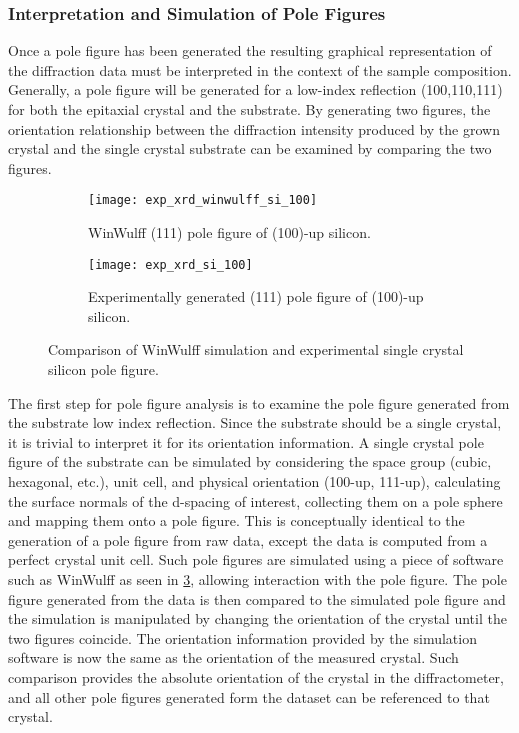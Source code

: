 \subsubsection{Interpretation and Simulation of Pole Figures} Once a pole figure has been generated the resulting graphical representation of the diffraction data must be interpreted in the context of the sample composition.
Generally, a pole figure will be generated for a low-index reflection (100,110,111) for both the epitaxial crystal and the substrate.
By generating two figures, the orientation relationship between the diffraction intensity produced by the grown crystal and the single crystal substrate can be examined by comparing the two figures.
\begin{figure}
 \centering \centering
 \begin{subfigure}[t]{0.53\textwidth}
  \centering \texttt{[image: exp\_xrd\_winwulff\_si\_100]}
  \caption{\label{fig:exp_xrd_winwulff_si_100}WinWulff (111) pole figure of (100)-up silicon.}
 \end{subfigure}\quad%
 \begin{subfigure}[t]{0.43\textwidth}
  \centering \texttt{[image: exp\_xrd\_si\_100]}
  \caption{\label{fig:exp_xrd_si_100}Experimentally generated (111) pole figure of (100)-up silicon.}
 \end{subfigure}
 \caption{\label{fig:exp_xray_winwulff}Comparison of WinWulff simulation and experimental single crystal silicon pole figure.}
\end{figure}

The first step for pole figure analysis is to examine the pole figure generated from the substrate low index reflection.
Since the substrate should be a single crystal, it is trivial to interpret it for its orientation information.
A single crystal pole figure of the substrate can be simulated by considering the space group (cubic, hexagonal, etc.), unit cell, and physical orientation (100-up, 111-up), calculating the surface normals of the d-spacing of interest, collecting them on a pole sphere and mapping them onto a pole figure.
This is conceptually identical to the generation of a pole figure from raw data, except the data is computed from a perfect crystal unit cell.
Such pole figures are simulated using a piece of software such as WinWulff\cite{Weber2006} as seen in \cref{fig:exp_xray_winwulff}, allowing interaction with the pole figure.
The pole figure generated from the data is then compared to the simulated pole figure and the simulation is manipulated by changing the orientation of the crystal until the two figures coincide.
The orientation information provided by the simulation software is now the same as the orientation of the measured crystal.
Such comparison provides the absolute orientation of the crystal in the diffractometer, and all other pole figures generated form the dataset can be referenced to that crystal.

